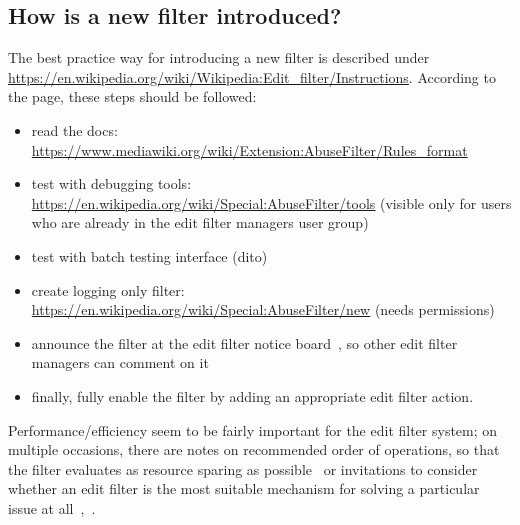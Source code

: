 \subsection{How is a new filter introduced?}

The best practice way for introducing a new filter is described under \url{https://en.wikipedia.org/wiki/Wikipedia:Edit_filter/Instructions}.
According to the page, these steps should be followed:
\begin{itemize}
    \item read the docs: \url{https://www.mediawiki.org/wiki/Extension:AbuseFilter/Rules_format}
    \item test with debugging tools: \url{https://en.wikipedia.org/wiki/Special:AbuseFilter/tools} (visible only for users who are already in the edit filter managers user group)
    \item test with batch testing interface (dito)
    \item create logging only filter: \url{https://en.wikipedia.org/wiki/Special:AbuseFilter/new} (needs permissions)
    \item announce the filter at the edit filter notice board~\cite{Wikipedia:EditFilterNoticeboard}, so other edit filter managers can comment on it
    \item finally, fully enable the filter by adding an appropriate edit filter action.
\end{itemize}

Performance/efficiency seem to be fairly important for the edit filter system;
on multiple occasions, there are notes on recommended order of operations, so that the filter evaluates as resource sparing as possible~\cite{Wikipedia:EditFilterInstructions} or invitations to consider whether an edit filter is the most suitable mechanism for solving a particular issue at all~\cite{Wikipedia:EditFilter},~\cite{Wikipedia:EditFilterRequested}.




